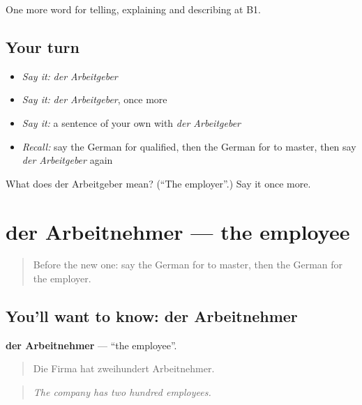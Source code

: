 \begin{grammarlens}[title={What you've built}]
One more word for telling, explaining and describing at B1.
\end{grammarlens}

\subsection*{Your turn}
\begin{itemize}
\raggedright
  \item \emph{Say it:} \emph{der Arbeitgeber}
  \item \emph{Say it:} \emph{der Arbeitgeber}, once more
  \item \emph{Say it:} a sentence of your own with \emph{der Arbeitgeber}
  \item \emph{Recall:} say the German for qualified, then the German for to master, then say \emph{der Arbeitgeber} again
\end{itemize}

\begin{tcolorbox}[breakable,colback=teal!4,colframe=teal!35!black,title={Before you move on}]
What does der Arbeitgeber mean? (\textquotedblleft{}The employer\textquotedblright{}.) Say it once more.
\end{tcolorbox}
\section[der Arbeitnehmer]{der Arbeitnehmer — the employee}

\label{lesson:GE-C350-arbeitnehmer}



\begin{quote}
Before the new one: say the German for to master, then the German for the employer.
\end{quote}

\subsection*{You'll want to know: der Arbeitnehmer}
\textbf{der Arbeitnehmer} — \textquotedblleft{}the employee\textquotedblright{}.

\begin{quote}
Die Firma hat zweihundert Arbeitnehmer.
\end{quote}

\begin{quote}
\emph{The company has two hundred employees.}
\end{quote}

